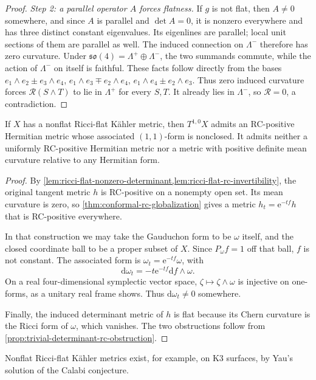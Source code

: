 \begin{proof}
\emph{Step 2: a parallel operator $A$ forces flatness.} If $g$ is not flat, then $A\ne0$ somewhere, and since $A$ is parallel and $\det A=0$, it is nonzero everywhere and has three distinct constant eigenvalues. Its eigenlines are parallel; local unit sections of them are parallel as well. The induced connection on $\Lambda^-$ therefore has zero curvature. Under $\mathfrak{so}(4)=\Lambda^+\oplus\Lambda^-$, the two summands commute, while the action of $\Lambda^-$ on itself is faithful. These facts follow directly from the bases $e_1\wedge e_2\pm e_3\wedge e_4$, $e_1\wedge e_3\mp e_2\wedge e_4$, $e_1\wedge e_4\pm e_2\wedge e_3$. Thus zero induced curvature forces $\mathscr R(S\wedge T)$ to lie in $\Lambda^+$ for every $S,T$. It already lies in $\Lambda^-$, so $\mathscr R=0$, a contradiction.
\end{proof}

\begin{theorem}\label{thm:ricci-flat-surface-rc-positive}
If $X$ has a nonflat Ricci-flat K\"ahler metric, then $T^{1,0}X$ admits an RC-positive Hermitian metric whose associated $(1,1)$-form is nonclosed. It admits neither a uniformly RC-positive Hermitian metric nor a metric with positive definite mean curvature relative to any Hermitian form.
\end{theorem}
\begin{proof}
By \cref{lem:ricci-flat-nonzero-determinant,lem:ricci-flat-rc-invertibility}, the original tangent metric $h$ is RC-positive on a nonempty open set. Its mean curvature is zero, so \cref{thm:conformal-rc-globalization} gives a metric $h_t=\mathrm e^{-tf}h$ that is RC-positive everywhere.

In that construction we may take the Gauduchon form to be $\omega$ itself, and the closed coordinate ball to be a proper subset of $X$. Since $P_\omega f=1$ off that ball, $f$ is not constant. The associated form is $\omega_t=\mathrm e^{-tf}\omega$, with
\[
 \mathrm d\omega_t=-t\mathrm e^{-tf}\mathrm df\wedge\omega.
\]
On a real four-dimensional symplectic vector space, $\zeta\mapsto\zeta\wedge\omega$ is injective on one-forms, as a unitary real frame shows. Thus $\mathrm d\omega_t\ne0$ somewhere.

Finally, the induced determinant metric of $h$ is flat because its Chern curvature is the Ricci form of $\omega$, which vanishes. The two obstructions follow from \cref{prop:trivial-determinant-rc-obstruction}.
\end{proof}

Nonflat Ricci-flat K\"ahler metrics exist, for example, on K3 surfaces, by Yau's solution of the Calabi conjecture.


